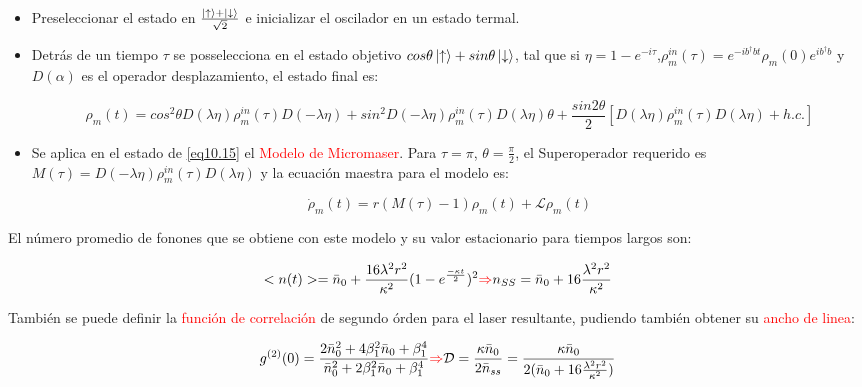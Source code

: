 \documentclass{book}
\begin{document}
\begin{itemize}
    \item Preseleccionar el estado en $\frac{\ket{\uparrow}+\ket{\downarrow}}{\sqrt{2}}$ e inicializar el oscilador en  un estado termal.
    \item Detrás de un tiempo $\tau$ se posselecciona en el estado objetivo $cos\theta\ket{\uparrow}+sin\theta\ket{\downarrow}$, tal que si $\eta=1-e^{-i\tau}$,$\rho_{m}^{in}(\tau)=e^{-ib^\dag bt}\rho_m(0)e^{ib^\dag b}$ y $D(\alpha)$ es el operador desplazamiento, el estado final es:

\begin{equation}\label{eq10.15}\rho_m(t)=cos^2\theta D(\lambda\eta)\rho_m^{in}(\tau)D(-\lambda\eta)+sin^2D(-\lambda\eta)\rho_m^{in}(\tau)D(\lambda\eta)\theta+\frac{sin 2\theta}{2}[D(\lambda\eta)\rho_m^{in}(\tau)D(\lambda\eta)+h.c.] \end{equation}

\item Se aplica en el estado de \ref{eq10.15} el \textcolor{red}{Modelo de Micromaser}. Para $\tau=\pi$, $\theta=\frac{\pi}{2}$, el Superoperador requerido es $M(\tau)=D(-\lambda\eta)\rho_m^{in}(\tau)D(\lambda\eta)$ y la ecuación maestra para el modelo es:

\begin{equation}\label{eq10.16}\dot{\rho}_m(t)=r(M(\tau)-1)\rho_m(t)+\mathcal{L}\rho_m(t)\end{equation}
\end{itemize}

El número promedio de fonones que se obtiene con este modelo y su valor estacionario para tiempos largos son:

\begin{equation}\label{eq10.17}<n(t)>=\bar{n}_0+\frac{16\lambda^2r^2}{\kappa^2}(1-e^{\frac{-\kappa t}{2}})^2
\textcolor{red}{\Rightarrow} n_{SS}=\bar{n}_0+16\frac{\lambda^2 r^2}{\kappa^2}\end{equation}

También se puede definir la \textcolor{red}{función de correlación} de segundo órden para el laser resultante, pudiendo también obtener su \textcolor{red}{ancho de linea}:

\begin{equation}\label{eq10.18}g^{(2)}(0)=\frac{2\bar{n}_0^2+4\beta_1^2\bar{n}_0+\beta_1^4}{\bar{n}_0^2+2\beta_1^2\bar{n}_0+\beta_1^4}\textcolor{red}{\Rightarrow}\mathcal{D}=\frac{\kappa\bar{n}_0}{2\bar{n}_{ss}}=\frac{\kappa \bar{n}_0}{2(\bar{n}_0+16\frac{\lambda^2r^2}{\kappa^2})}\end{equation}
\end{document}
